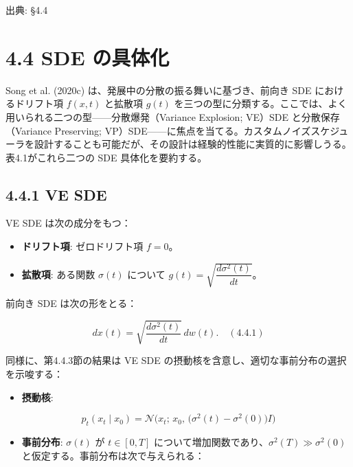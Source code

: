 

{\color{gray}\footnotesize 出典: §4.4\par}
\vspace{0.2em}

\section*{4.4 SDE の具体化}


Song et al. (2020c) は、発展中の分散の振る舞いに基づき、前向き SDE におけるドリフト項 $f(x,t)$ と拡散項 $g(t)$ を三つの型に分類する。ここでは、よく用いられる二つの型——分散爆発（Variance Explosion; VE）SDE と分散保存（Variance Preserving; VP）SDE——に焦点を当てる。カスタムノイズスケジューラを設計することも可能だが、その設計は経験的性能に実質的に影響しうる。表4.1がこれら二つの SDE 具体化を要約する。



\subsection*{4.4.1 VE SDE}


VE SDE は次の成分をもつ：

\begin{itemize}
\item \textbf{ドリフト項}: ゼロドリフト項 $f=0$。
\item \textbf{拡散項}: ある関数 $\sigma(t)$ について $g(t)=\sqrt{\dfrac{d\sigma^2(t)}{dt}}$。
\end{itemize}


前向き SDE は次の形をとる：

\[
dx(t)=\sqrt{\frac{d\sigma^2(t)}{dt}}\, dw(t). \quad (4.4.1)
\]


同様に、第4.4.3節の結果は VE SDE の摂動核を含意し、適切な事前分布の選択を示唆する：

\begin{itemize}
\item \textbf{摂動核}:
\end{itemize}

\[
p_t(x_t\mid x_0)=\mathcal{N}\bigl(x_t;\, x_0,\, \bigl(\sigma^2(t)-\sigma^2(0)\bigr)I\bigr)
\]


\begin{itemize}
\item \textbf{事前分布}: $\sigma(t)$ が $t\in[0,T]$ について増加関数であり、$\sigma^2(T)\gg\sigma^2(0)$ と仮定する。事前分布は次で与えられる：
\end{itemize}

